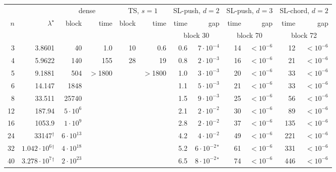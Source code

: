 \begin{tabular}{@{}rr rr rr rr rr rr@{}}
\toprule
 & & \multicolumn{2}{c}{dense} & \multicolumn{2}{c}{TS, $s=1$} & \multicolumn{2}{c}{SL-push, $d=2$} & \multicolumn{2}{c}{SL-push, $d=3$} & \multicolumn{2}{c}{SL-chord, $d=2$}\\
\cmidrule(lr){3-4}\cmidrule(lr){5-6}\cmidrule(lr){7-8}\cmidrule(lr){9-10}\cmidrule(l){11-12}
$n$ & $\lambda^\star$ & block & time & block & time & time & gap & time & gap & time & gap\\
 & & & & & & \multicolumn{2}{c}{block 30} & \multicolumn{2}{c}{block 70} & \multicolumn{2}{c}{block 72}\\
\midrule
3 & 3.8601 & 40 & 1.0 & 10 & 0.6 & 0.6 & $7{\cdot}10^{-4}$ & 14 & $<\!10^{-6}$ & 12 & $<\!10^{-6}$ \\
4 & 5.9622 & 140 & 155 & 28 & 19 & 0.8 & $2{\cdot}10^{-3}$ & 16 & $<\!10^{-6}$ & 21 & $<\!10^{-6}$ \\
5 & 9.1881 & 504 & $>$1800 &  & $>$1800 & 1.0 & $3{\cdot}10^{-3}$ & 20 & $<\!10^{-6}$ & 33 & $<\!10^{-6}$ \\
6 & 14.147 & 1848 &  &  &  & 1.1 & $5{\cdot}10^{-3}$ & 21 & $<\!10^{-6}$ & 33 & $<\!10^{-6}$ \\
8 & 33.511 & 25740 &  &  &  & 1.5 & $9{\cdot}10^{-3}$ & 25 & $<\!10^{-6}$ & 56 & $<\!10^{-6}$ \\
12 & 187.94 & $5{\cdot}10^{6}$ &  &  &  & 2.1 & $2{\cdot}10^{-2}$ & 30 & $<\!10^{-6}$ & 89 & $<\!10^{-6}$ \\
16 & 1053.9 & $1{\cdot}10^{9}$ &  &  &  & 2.8 & $2{\cdot}10^{-2}$ & 37 & $<\!10^{-6}$ & 135 & $<\!10^{-6}$ \\
24 & 33147$^\dagger$ & $6{\cdot}10^{13}$ &  &  &  & 4.2 & $4{\cdot}10^{-2}$ & 49 & $<\!10^{-6}$ & 221 & $<\!10^{-6}$ \\
32 & $1.042{\cdot}10^{6}$$^\dagger$ & $4{\cdot}10^{18}$ &  &  &  & 5.2 & $6{\cdot}10^{-2}$$^*$ & 61 & $<\!10^{-6}$ & 331 & $<\!10^{-6}$ \\
40 & $3.278{\cdot}10^{7}$$^\dagger$ & $2{\cdot}10^{23}$ &  &  &  & 6.5 & $8{\cdot}10^{-2}$$^*$ & 74 & $<\!10^{-6}$ & 446 & $<\!10^{-6}$ \\
\bottomrule
\end{tabular}
